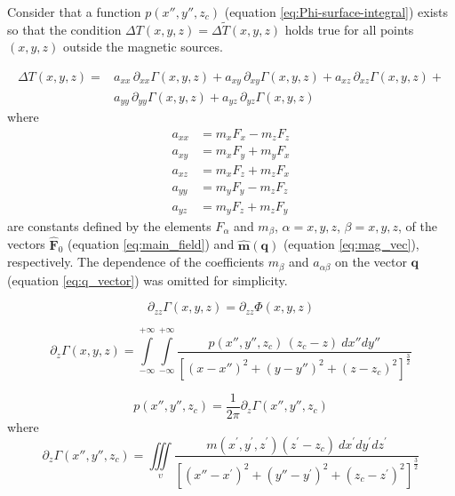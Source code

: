 Consider that a function $p(x'', y'', z_{c})$ (equation \ref{eq:Phi-surface-integral}) 
exists so that the condition
$\Delta T(x, y, z) = \Delta \tilde{T}(x, y, z)$ holds true for all points $(x, y, z)$
outside the magnetic sources. 

\begin{equation}
\begin{split}
\Delta T(x, y, z) = 
&a_{xx} \, \partial_{xx} \Gamma(x, y, z) + 
a_{xy} \, \partial_{xy} \Gamma(x, y, z) + 
a_{xz} \, \partial_{xz} \Gamma(x, y, z) + \\
&a_{yy} \, \partial_{yy} \Gamma(x, y, z) + 
a_{yz} \, \partial_{yz} \Gamma(x, y, z)
\end{split}
\label{eq:tfanomaly-alternative}
\end{equation}
where 
\begin{equation}
\begin{split}
a_{xx} &= m_{x} F_{x} - m_{z} F_{z} \\
a_{xy} &= m_{x} F_{y} + m_{y} F_{x} \\
a_{xz} &= m_{x} F_{z} + m_{z} F_{x} \\
a_{yy} &= m_{y} F_{y} - m_{z} F_{z} \\
a_{yz} &= m_{y} F_{z} + m_{z} F_{y}
\end{split}
\label{eq:a-coefficients}
\end{equation}
are constants defined by the elements $F_{\alpha}$ and $m_{\beta}$, 
$\alpha = x, y, z$, $\beta = x, y, z$, 
of the vectors $\hat{\mathbf{F}}_{0}$ (equation \ref{eq:main_field}) and
$\hat{\mathbf{m}}(\mathbf{q})$ (equation \ref{eq:mag_vec}), respectively.
The dependence of the coefficients $m_{\beta}$ and $a_{\alpha\beta}$ on the 
vector $\mathbf{q}$ (equation \ref{eq:q_vector}) was omitted for simplicity.

\begin{equation}
	\partial_{zz} \Gamma(x, y, z) = \partial_{zz} \Phi(x, y, z)
	\label{eq:equality-partial-derivatives-zz}
\end{equation}

\begin{equation}
	\partial_{z} \Gamma(x, y, z) = \int\limits_{-\infty}^{+\infty}\int\limits_{-\infty}^{+\infty}
	\frac{p(x'', y'', z_{c}) \, (z_{c} - z) \: dx'' dy''}
	{\left[ (x-x'')^2 + (y-y'')^2 + (z-z_{c})^2 \right]^{\frac{3}{2}}}
	\label{eq:DzPhi-surface-integral}
\end{equation}

\begin{equation}
	p(x'', y'', z_{c}) = \frac{1}{2\pi} \partial_{z} \Gamma(x'', y'', z_{c})
	\label{eq:function-p}
\end{equation}
where
\begin{equation}
	\partial_{z} \Gamma(x'', y'', z_{c}) = \iiint\limits_{\upsilon} 
	\frac{m(x^{\prime}, y^{\prime}, z^{\prime}) (z^{\prime} - z_{c}) \: dx^{\prime} dy^{\prime} dz^{\prime}}
	{\left[ (x''-x^{\prime})^2 + (y''-y^{\prime})^2 + (z_{c}-z^{\prime})^2 \right]^{\frac{3}{2}}}
	\label{eq:DzGamma-volume-integral}
\end{equation}

